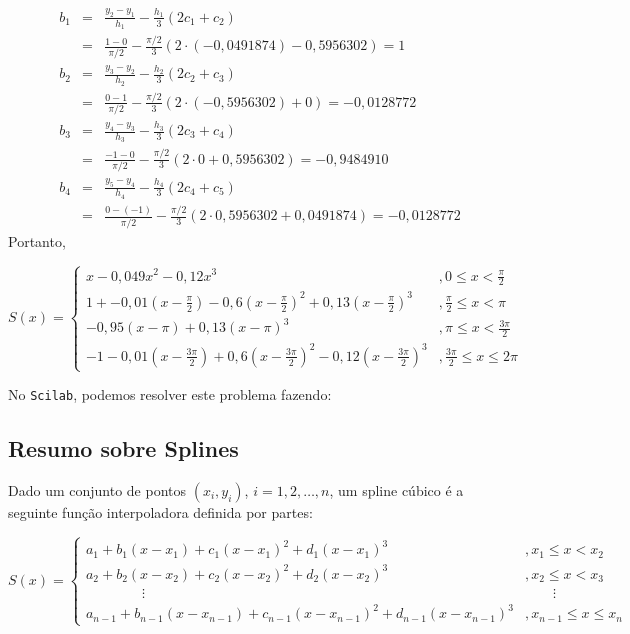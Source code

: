 \begin{eqnarray*}
b_1&=& \frac{y_{2}-y_1}{h_1}-\frac{h_1}{3}(2c_1+c_{2})\\
&=&\frac{1-0}{\pi/2}-\frac{\pi/2}{3}(2\cdot (-0,0491874)-0,5956302)=1\\
b_2&=&\frac{y_{3}-y_2}{h_2}-\frac{h_2}{3}(2c_2+c_{3})\\
&=&\frac{0-1}{\pi/2}-\frac{\pi/2}{3}(2\cdot(-0,5956302) +0)=-0,0128772\\
b_3&=&\frac{y_{4}-y_3}{h_3}-\frac{h_3}{3}(2c_3+c_{4})\\
&=&\frac{-1-0}{\pi/2}-\frac{\pi/2}{3}(2\cdot 0+0,5956302)=-0,9484910\\
b_4&=&\frac{y_{5}-y_4}{h_4}-\frac{h_4}{3}(2c_4+c_{5})\\
&=&\frac{0-(-1)}{\pi/2}-\frac{\pi/2}{3}(2\cdot 0,5956302+0,0491874)=-0,0128772
\end{eqnarray*}
Portanto,
\begin{small}
\begin{equation*}
S(x)=\left\{\begin{array}{ll}
x-0,049x^2-0,12x^3&, 0\leq x<\frac{\pi}{2}\\
1+-0,01(x-\frac{\pi}{2})-0,6(x-\frac{\pi}{2})^2+0,13(x-\frac{\pi}{2})^3&, \frac{\pi}{2}\leq x<\pi\\
-0,95(x-\pi)+0,13(x-\pi)^3&, \pi\leq x<\frac{3\pi}{2}\\
-1-0,01(x-\frac{3\pi}{2})+0,6(x-\frac{3\pi}{2})^2-0,12(x-\frac{3\pi}{2})^3&, \frac{3\pi}{2}\leq x\leq2\pi
\end{array}\right.
\end{equation*}  
\end{small}

\ifisscilab
No \verb+Scilab+, podemos resolver este problema fazendo:

\fi

\subsection{Resumo sobre Splines}

Dado um conjunto de pontos $(x_i,y_i)$, $i=1,2,\ldots,n$, um spline cúbico é a seguinte função interpoladora definida por partes:
\begin{small}
\begin{equation*}
  S(x) \!=\! \left\{\begin{array}{ll}
       \!\!\!a_1 \!+\! b_1(x\!-\!x_1) \!+\! c_1(x\!-\!x_1)^2 \!+\! d_1(x\!-\!x_1)^3 &\!\!\!\!\!, x_1\leq x < x_2\\
      \!\!\!a_2 \!+\! b_2(x\!-\!x_2) \!+\! c_2(x\!-\!x_2)^2 \!+\! d_2(x\!-\!x_2)^3 &\!\!\!\!\!, x_2 \leq x < x_3\\
      \qquad\qquad \vdots & \qquad\vdots \\
      \!\!\!a_{n-1} \!+\! b_{n-1}(x\!-\!x_{n-1}) \!+\! c_{n-1}(x\!-\!x_{n-1})^2 \!+\! d_{n-1}(x\!-\!x_{n-1})^3 &\!\!\!\!\!, x_{n-1} \leq x \leq x_n \end{array}\right.
\end{equation*}
\end{small}

